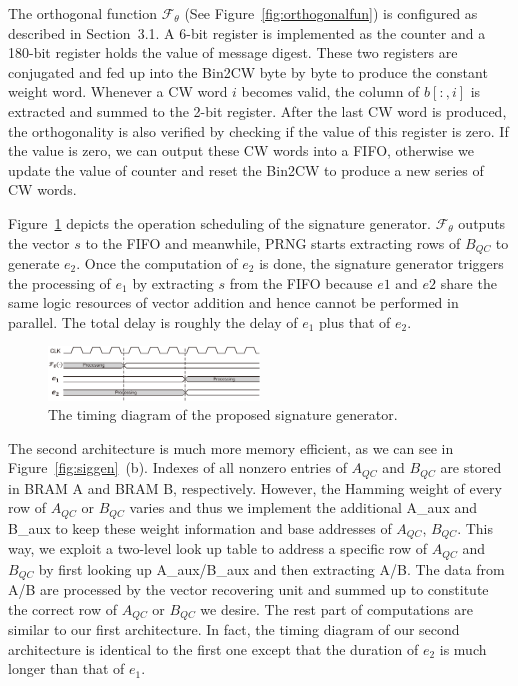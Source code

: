 \documentclass[10pt,journal,compsoc]{IEEEtran}
\begin{document}
The orthogonal function $\mathcal{F}_{\theta}$ (See Figure~\ref{fig:orthogonalfun}) is configured as described in Section~3.1. A 6-bit register is implemented as the counter and a 180-bit register holds the value of message digest. These two registers are conjugated and fed up into the Bin2CW byte by byte  to produce the constant weight word. Whenever a CW word $i$ becomes valid, the column of $b[:,i]$ is extracted and summed to the 2-bit register. After the last CW word is produced, the orthogonality is also verified by checking if the value of this register is zero.
If the value is zero, we can output these CW words into a FIFO, otherwise we update the value of counter and reset the Bin2CW to produce a new series of CW words.

Figure~\ref{fig:timingdiagram} depicts the operation scheduling of the signature generator. $\mathcal{F}_{\theta}$ outputs the vector $s$ to the FIFO and meanwhile, PRNG starts extracting rows of $B_{QC}$ to generate $e_2$. Once the computation of $e_2$ is done, the signature generator triggers the processing of $e_1$ by extracting $s$ from the FIFO because $e1$ and $e2$ share the same logic resources of vector addition and hence cannot be performed in parallel. The total delay is roughly the delay of $e_1$ plus that of $e_2$.

\begin{figure}[!htb]\centering
      \includegraphics[width=0.5\textwidth]{./fig/timingdiagram.eps}
  \caption{The timing diagram of the proposed signature generator.}\label{fig:timingdiagram}
\end{figure}

The second architecture is much more memory efficient, as we can see in Figure~\ref{fig:siggen}~(b). Indexes of all nonzero entries of $A_{QC}$
and $B_{QC}$ are stored in BRAM A and BRAM B, respectively. However,  the Hamming weight of every row  of $A_{QC}$ or $B_{QC}$ varies and thus we implement the additional A\_aux and B\_aux to keep these weight information and base addresses of $A_{QC}$, $B_{QC}$.
This way, we exploit a two-level look up table to address a specific row of $A_{QC}$ and $B_{QC}$ by first looking up A\_aux/B\_aux and then extracting A/B. The data from A/B are processed by the vector recovering unit and summed up to constitute the correct row of $A_{QC}$ or $B_{QC}$ we desire. The rest part of computations are similar to our first architecture. In fact, the timing diagram of our second architecture is identical to the first one except that the duration of $e_2$ is much longer than that of $e_1$.
\end{document}
